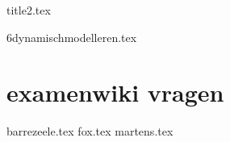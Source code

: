 \documentclass[a4paper,11pt]{article}
\begin{document}


{title2.tex}

\clearpage

\thispagestyle{empty}

\tableofcontents

\clearpage

\begin{comment}

{1systemsanalysis.tex}

\end{comment}


\begin{comment}

{1informatiesystemen.tex}

{2uml.tex}

{3buziness.tex}

{4domainmodel.tex}

{5requirementsmodel.tex}



\end{comment}

{6dynamischmodelleren.tex}

\begin{comment}


{7applicatielaag.tex}
{8implementationdiagram.tex}
{8deploymentdiagram.tex}

\end{comment}

\section{examenwiki vragen}
{barrezeele.tex}
{fox.tex}
{martens.tex}




\listofalgorithms
\clearpage
\listoffigures
\clearpage
\listoftables
\clearpage

\printglossary[title=Termen,toctitle=Lijst van termen]

\printglossary[type=\acronymtype]


\clearpage
\printsolutions
\end{document}
